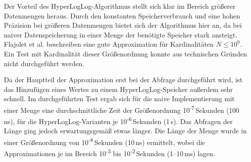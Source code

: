 Der Vorteil des HyperLogLog-Algorithmus stellt sich klar im Bereich größerer Datenmengen heraus.
Durch den konstanten Speicherverbrauch und eine hohen Präzision bei größeren Datenmengen bietet sich der Algorithmus hier an, da bei naiver Datenspeicherung in einer Menge der benötigte Speicher stark ansteigt.
Flajolet et al. \cite{flajolet2007} beschreiben eine gute Approximation für Kardinalitäten $N \le 10^9$.
Ein Test mit Kardinalität dieser Größenordnung konnte aus technischen Gründen nicht durchgeführt werden.

Da der Hauptteil der Approximation erst bei der Abfrage durchgeführt wird, ist das Hinzufügen eines Wertes zu einem HyperLogLog-Speicher außerdem sehr schnell.
Im durchgeführten Test ergab sich für die naive Implementierung mit einer Menge eine durchschnittliche Zeit der Größenordnung 10\textsuperscript{-7}\,Sekunden (100\,ns), für die HyperLogLog-Varianten je 10\textsuperscript{-6}\,Sekunden (1\,\textmu{}s).
Das Abfragen der Länge ging jedoch erwartungsgemäß etwas länger.
Die Länge der Menge wurde in einer Größenordnung von 10\textsuperscript{-8}\,Sekunden (10\,ns) ermittelt, wobei die Approximationen je im Bereich 10\textsuperscript{-3} bis 10\textsuperscript{-2}\,Sekunden (1--10\,ms) lagen.